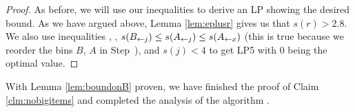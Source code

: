 \begin{proof}

As before, we will use our inequalities to derive an LP showing the desired
bound. As we have argued above, Lemma \ref{lem:eplusr} gives us that
$s(r) > 2.8$. We also use inequalities , ,
$s(B_{\leftarrow j}) \le s(A_{\leftarrow j}) \le s(A_{\leftarrow x})$
(this is true because we reorder the bins $B$, $A$ in Step~),
and $s(j) < 4$ to get LP5 with 0 being the optimal value.
\end{proof}

With Lemma \ref{lem:boundonB} proven, we have finished the proof of Claim \ref{clm:nobigitems}
and completed the analysis of the algorithm \tbalg.

